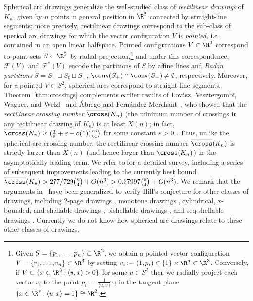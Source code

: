 %
Spherical arc drawings generalize the well-studied class of \emph{rectilinear drawings} of $K_n$, given by $n$ points in general position in $\R^2$ connected by straight-line segments; more precisely, rectilinear drawings correspond to the sub-class of sperical arc drawings for which the vector configuration $V$ is \emph{pointed}, i.e., contained in an open linear halfspace. Pointed configurations $V\subset \R^3$ correspond to point sets $S\subset \R^2$ by radial projection,\footnote{Given $S=\{p_1,\dots,p_n\} \subset \R^2$, we obtain a pointed vector configuration $V=\{v_1,\dots,v_n\} \subset \R^3$ by setting $v_i:=(1,p_i)\in \{1\}\times \R^d \subset \R^3$. Conversely, if $V \subset \{x \in \R^3\colon \langle u,x\rangle>0\}$ for some $u\in S^2$ then we radially project each vector $v_i$ to the point $p_i:=\frac{1}{\langle u, v_i\rangle} v_i$ in the tangent plane $\{x\in \R^r\colon \langle u,x\rangle = 1\} \cong \R^2$.}
and under this correspondence, $\mathcal{F}(V)$ and $\mathcal{F}^*(V)$ encode the partitions of $S$ by affine lines and \emph{Radon partitions} $S=S_-\sqcup S_0 \sqcup S_+$, $\conv(S_+) \cap \conv(S_-)\neq \emptyset$, respectively. Moreover, for a pointed $V \subset S^2$, spherical arcs correspond to straight-line segments.  
%
Theorem~\ref{thm:crossings} complements earlier results of Lov\'asz, Vesztergombi, Wagner, and Welzl~\cite{Lovasz:2004aa} and \'Abrego and Fern\'andez-Merchant~\cite{Abrego:2005aa}, who showed that the \emph{rectilinear crossing number} $\overline{\cross}(K_n)$ (the minimum number of crossings in any rectilinear drawing of $K_n$) is at least $X(n)$; in fact, $\overline{\cross}(K_n)\geq (\frac{3}{8}+\varepsilon+o(1))\binom{n}{4}$ for some constant $\varepsilon>0$ \cite{Lovasz:2004aa}. Thus, unlike the spherical arc crossing number, the rectilinear crossing number $\overline{\cross}(K_n)$ is strictly larger than $X(n)$ (and hence larger than $\cross(K_n)$) in the asymptotically leading term. We refer to  \cite{Abrego:2013ab} for a detailed survey, including a series of subsequent improvements \cite{Balogh:2006aa,Aichholzer:2007aa,Abrego:2008aa,Abrego:2008ab} leading to the currently best bound \cite{Abrego:2012aa} $\overline{\cross}(K_n) > 277/729 \binom{n}{4}+O(n^3) > 0.37997 \binom{n}{4}+O(n^3)$. We remark that the arguments in~\cite{Lovasz:2004aa,Abrego:2005aa} have been generalized to verify Hill's conjecture for other classes of drawings, including $2$-page drawings \cite{Abrego:2013aa}, monotone drawings \cite{Balko:2015aa}, cylindrical, $x$-bounded, and shellable drawings  \cite{Abrego:2014aa}, bishellable drawings \cite{Abrego:2018aa}, and seq-shellable drawings \cite{Mutzel:2018aa}. Currently we do not know %
how spherical arc drawings relate to these other classes of drawings.
%

